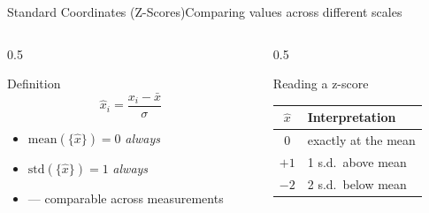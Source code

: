 \documentclass[aspectratio=169,11pt]{beamer}
\begin{document}
\begin{frame}{Standard Coordinates (Z-Scores)}{Comparing values across different scales}
  \begin{columns}[T]
    \begin{column}{0.5\textwidth}
      \begin{block}{Definition}
        \[ \hat{x}_i = \frac{x_i - \bar{x}}{\sigma} \]
      \end{block}
      \begin{itemize}\small
        \item $\text{mean}(\{\hat x\}) = 0$ \emph{always}
        \item $\text{std}(\{\hat x\}) = 1$ \emph{always}
        \item {} — comparable across measurements
      \end{itemize}
    \end{column}
    \begin{column}{0.5\textwidth}
      \begin{exampleblock}{Reading a z-score}
        \small
        \renewcommand{\arraystretch}{1.25}
        \begin{tabular}{@{}cl@{}}
          \toprule
          $\hat x$ & Interpretation \\
          \midrule
          $0$ & exactly at the mean \\
          $+1$ & 1 s.d.\ above mean \\
          $-2$ & 2 s.d.\ below mean \\
          \bottomrule
        \end{tabular}
      \end{exampleblock}
    \end{column}
  \end{columns}
\end{frame}
\end{document}
